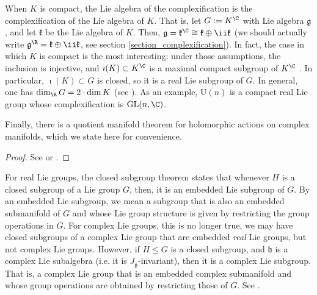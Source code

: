 When \(K\) is compact, the Lie algebra of the complexification is the complexification of the Lie algebra of \(K\). That is, let \(G:=K^\C\) with Lie algebra \(\mathfrak{g}\), and let \(\mathfrak{k}\) be the Lie algebra of \(K\). Then, \(\mathfrak{g}=\mathfrak{k}^\C\cong \mathfrak{k}\oplus \ii \mathfrak{k}\) (we should actually write \(\mathfrak{g}^\R=\mathfrak{k}\oplus \ii \mathfrak{k}\), see section \ref{section_complexification}). In fact, the case in which \(K\) is compact is the most interesting: under those assumptions, the inclusion is injective, and \(\imath(K)\subset K^\C\) is a maximal compact subgroup of \(K^\C\) \parencite[Prop. 15.2.1]{hilgert2011structure}. In particular, \(\imath(K) \subset G\) is closed, so it is a real Lie subgroup of \(G\). In general, one has \(\dim _\R G=2\cdot \dim K\) (see \parencite[Prop. 15.2.1]{hilgert2011structure}). As an example, \(\mathrm{U}(n)\) is a compact real Lie group whose complexification is \(\mathrm{GL}(n,\C)\).    

Finally, there is a quotient manifold theorem for holomorphic actions on complex manifolds, which we state here for convenience.

\begin{proof}
    See \parencite[Prop. 2.1.13]{huybrechts2005complex} or \parencite[Lemma 3.2.6]{Heinzner_Huckleberry_Mathematical}.
\end{proof}

\begin{obs}
    For real Lie groups, the closed subgroup theorem \parencite[Th. 9.3.7]{hilgert2011structure} states that whenever \(H\) is a closed subgroup of a Lie group \(G\), then, it is an embedded Lie subgroup of \(G\). By an embedded Lie subgroup, we mean a subgroup that is also an embedded submanifold of \(G\) and whose Lie group structure is given by restricting the group operations in \(G\). For complex Lie groups, this is no longer true, we may have closed subgroups of a complex Lie group that are embedded \textit{real} Lie groups, but not complex Lie groups. However, if \(H \leq G\) is a closed subgroup, and \(\mathfrak{h}\) is a complex Lie subalgebra (i.e. it is \(J_{\mathfrak{g}}\)-invariant), then it is a complex Lie subgroup. That is, a complex Lie group that is an embedded complex submanifold and whose group operations are obtained by restricting those of \(G\). See \parencite[Ch. IX, Example 2.1]{KobayashiNomizu1969Vol2}.
\end{obs}


